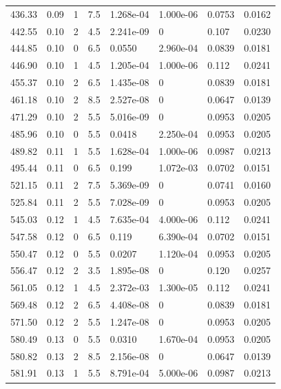 \documentclass[preview]{standalone}
\begin{document}
{{{\begin{tabular}{L{1.2cm}C{1.2cm} C{0.3cm}C{0.5cm} C{1.4cm}C{1.4cm} C{1.4cm}C{1.4cm}}
  436.33  &  0.09  & 1     & 7.5 &  1.268e-04  & 1.000e-06  & 0.0753 &  0.0162   \\ 
  442.55  &  0.10  & 2     & 4.5 &  2.241e-09  & 0  & 0.107 &  0.0230   \\ 
  444.85  &  0.10  & 0     & 6.5 &  0.0550  & 2.960e-04  & 0.0839 &  0.0181   \\ 
  446.90  &  0.10  & 1     & 4.5 &  1.205e-04  & 1.000e-06  & 0.112 &  0.0241   \\ 
  455.37  &  0.10  & 2     & 6.5 &  1.435e-08  & 0  & 0.0839 &  0.0181   \\ 
  461.18  &  0.10  & 2     & 8.5 &  2.527e-08  & 0  & 0.0647 &  0.0139   \\ 
  471.29  &  0.10  & 2     & 5.5 &  5.016e-09  & 0  & 0.0953 &  0.0205   \\ 
  485.96  &  0.10  & 0     & 5.5 &  0.0418  & 2.250e-04  & 0.0953 &  0.0205   \\ 
  489.82  &  0.11  & 1     & 5.5 &  1.628e-04  & 1.000e-06  & 0.0987 &  0.0213   \\ 
  495.44  &  0.11  & 0     & 6.5 &  0.199  & 1.072e-03  & 0.0702 &  0.0151   \\ 
  521.15  &  0.11  & 2     & 7.5 &  5.369e-09  & 0  & 0.0741 &  0.0160   \\ 
  525.84  &  0.11  & 2     & 5.5 &  7.028e-09  & 0  & 0.0953 &  0.0205   \\ 
  545.03  &  0.12  & 1     & 4.5 &  7.635e-04  & 4.000e-06  & 0.112 &  0.0241   \\ 
  547.58  &  0.12  & 0     & 6.5 &  0.119  & 6.390e-04  & 0.0702 &  0.0151   \\ 
  550.47  &  0.12  & 0     & 5.5 &  0.0207  & 1.120e-04  & 0.0953 &  0.0205   \\ 
  556.47  &  0.12  & 2     & 3.5 &  1.895e-08  & 0  & 0.120 &  0.0257   \\ 
  561.05  &  0.12  & 1     & 4.5 &  2.372e-03  & 1.300e-05  & 0.112 &  0.0241   \\ 
  569.48  &  0.12  & 2     & 6.5 &  4.408e-08  & 0  & 0.0839 &  0.0181   \\ 
  571.50  &  0.12  & 2     & 5.5 &  1.247e-08  & 0  & 0.0953 &  0.0205   \\ 
  580.49  &  0.13  & 0     & 5.5 &  0.0310  & 1.670e-04  & 0.0953 &  0.0205   \\ 
  580.82  &  0.13  & 2     & 8.5 &  2.156e-08  & 0  & 0.0647 &  0.0139   \\ 
  581.91  &  0.13  & 1     & 5.5 &  8.791e-04  & 5.000e-06  & 0.0987 &  0.0213   \\ 

\end{tabular}}}}
\end{document}
